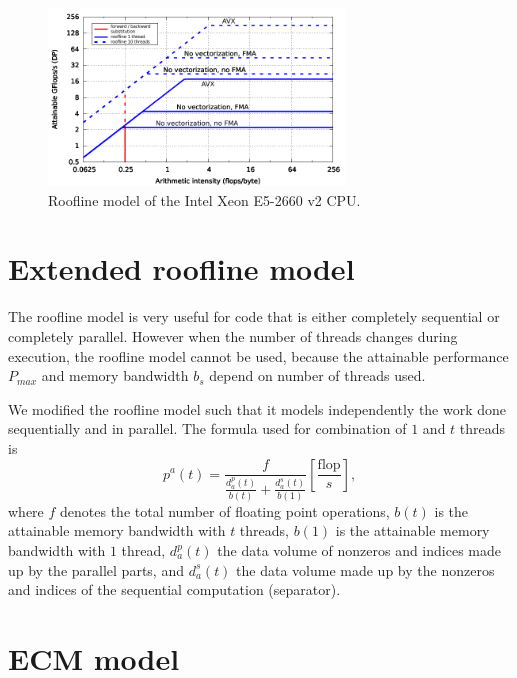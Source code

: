 {\begin{figure}[H]
   \centering
   \includegraphics[width=0.7\textwidth,clip=true]{images/roofline_emmy_Xeon2660v2}
   \caption{Roofline model of the  Intel Xeon E5-2660 v2 CPU.}
  \label{fig:roofline_emmy}
\end{figure}


\section{Extended roofline model}
\label{sec:mrm}

The roofline model is very useful for code that is either completely sequential or completely parallel. However when the number of threads changes during execution, the roofline model cannot be used, because the attainable performance $P_{max}$ and memory bandwidth $b_s$ depend on number of threads used.

We modified the roofline model such that it models independently the work done sequentially and in parallel.
The formula used for combination of $1$ and $t$ threads is
%
\begin{equation}
  p^{a}(t) 
  = \frac{
      f
    }{
     \frac{d_a^p(t) }{  b(t) } + \frac{ d_a^s(t) }{ b(1) }
    } \left[ \frac{\text{flop}}{s} \right],
\end{equation}
%
where $f$ denotes the total number of floating point operations,
$b(t)$ is the attainable memory bandwidth with $t$ threads,
$b(1)$ is the attainable memory bandwidth with $1$ thread,
$d_a^p(t)$ the data volume of nonzeros and indices made up by the parallel 
parts, and $d_a^s(t)$ the data volume made up by the nonzeros and indices of the
sequential computation (separator). 

\section{ECM model}


}